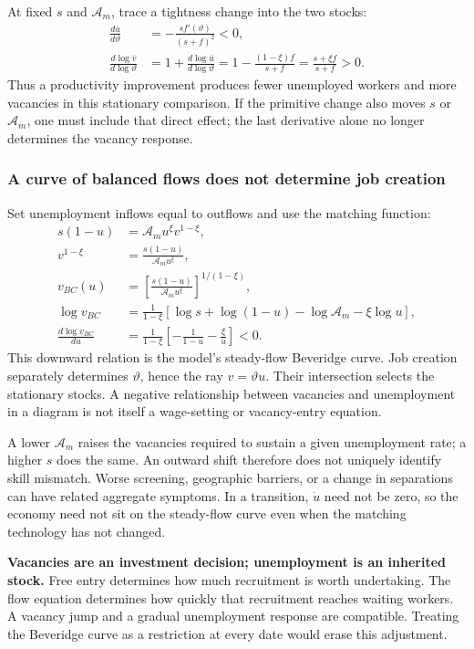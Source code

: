 At fixed $s$ and $\mathcal A_m$, trace a tightness change into the two stocks:
\begin{align}
 \frac{d\bar u}{d\vartheta}
 &=-\frac{s f'(\vartheta)}{(s+f)^2}<0,\\
 \frac{d\log\bar v}{d\log\vartheta}
 &=1+\frac{d\log\bar u}{d\log\vartheta}
  =1-\frac{(1-\xi)f}{s+f}
  =\frac{s+\xi f}{s+f}>0.
\end{align}
Thus a productivity improvement produces fewer unemployed workers and more
vacancies in this stationary comparison. If the primitive change also moves
$s$ or $\mathcal A_m$, one must include that direct effect; the last derivative
alone no longer determines the vacancy response.

\subsubsection{A curve of balanced flows does not determine job creation}

Set unemployment inflows equal to outflows and use the matching function:
\begin{align}
 s(1-u)&=\mathcal A_m u^\xi v^{1-\xi},\\
 v^{1-\xi}&=\frac{s(1-u)}{\mathcal A_m u^\xi},\\
 v_{BC}(u)&=\left[\frac{s(1-u)}{\mathcal A_m u^\xi}\right]^{1/(1-\xi)},\\
 \log v_{BC}
 &=\frac1{1-\xi}[\log s+\log(1-u)-\log\mathcal A_m-\xi\log u],\\
 \frac{d\log v_{BC}}{du}
 &=\frac1{1-\xi}\left[-\frac1{1-u}-\frac\xi u\right]<0.
\end{align}
This downward relation is the model's steady-flow Beveridge curve. Job
creation separately determines $\vartheta$, hence the ray $v=\vartheta u$.
Their intersection selects the stationary stocks. A negative relationship
between vacancies and unemployment in a diagram is not itself a wage-setting
or vacancy-entry equation.

A lower $\mathcal A_m$ raises the vacancies required to sustain a given
unemployment rate; a higher $s$ does the same. An outward shift therefore
does not uniquely identify skill mismatch. Worse screening, geographic
barriers, or a change in separations can have related aggregate symptoms.
In a transition, $\dot u$ need not be zero, so the economy need not sit on the
steady-flow curve even when the matching technology has not changed.

\begin{blueblock}
\textbf{Vacancies are an investment decision; unemployment is an inherited stock.}
Free entry determines how much recruitment is worth undertaking. The flow
equation determines how quickly that recruitment reaches waiting workers.
A vacancy jump and a gradual unemployment response are compatible. Treating
the Beveridge curve as a restriction at every date would erase this adjustment.
\end{blueblock}

